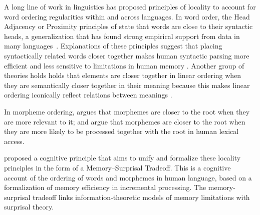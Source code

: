 \documentclass[11pt,letterpaper]{article}
\newcommand{\citep}{\parencite}
\newcommand{\citet}{\Textcite}
\newcommand\mhahn[1]{{\color{red}(#1)}}
\begin{document}
A long line of work in linguistics has proposed principles of locality to account for word ordering regularities within and across languages.
In word order, the Head Adjacency or Proximity principles of \citet{frazier1985syntactic,rijkhoff-word-1986} state that words are close to their syntactic heads, a generalization that has found strong empirical support from data in many languages~\citep[e.g.][]{hawkins-performance-1994,liu2008dependency, futrell-large-scale-2015-1, liu-dependency-2017}.
Explanations of these principles suggest that placing syntactically related words closer together makes human syntactic parsing more efficient and less sensitive to limitations in human memory \citep{frazier1985syntactic, gibson1998linguistic, hawkins-efficiency-2003, futrell-noisy-context-2017}.
Another group of theories holds holds that elements are closer together in linear ordering when they are semantically closer together in their meaning because this makes linear ordering iconically reflect relations between meanings \citep{givon1985iconicity}.

In morpheme ordering, \citet{bybee-morphology-1985} argues that morphemes are closer to the root when they are more relevant to it; \citet{hay2002speech} and \citet{plag2002the} argue that morphemes are closer to the root when they are more likely to be processed together with the root in human lexical access.




\citet{Hahn2020modeling} proposed a cognitive principle that aims to unify and formalize these locality principles in the form of a Memory--Surprisal Tradeoff.
This is a cognitive account of the ordering of words and morphemes in human language, based on a formalization of memory efficiency in incremental processing.
The memory-surprisal tradeoff links information-theoretic models of memory limitations with surprisal theory.
\end{document}
